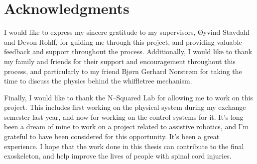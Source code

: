 \section*{Acknowledgments}

I would like to express my sincere gratitude to my supervisors, Øyvind Stavdahl and Devon Rohlf, for guiding me through this project, and providing valuable feedback and support throughout the process. 
Additionally, I would like to thank my family and friends for their support and encouragement throughout this process, and particularly to my friend Bjørn Gerhard Norstrøm for taking the time to discuss the physics behind the whiffletree mechanism.

Finally, I would like to thank the N--Squared Lab for allowing me to work on this project. This includes first working on the physical system during my exchange semester last year, and now for working on the control systems for it. It's long been a dream of mine to work on a project related to assistive robotics, and I'm grateful to have been considered for this opportunity. It's been a great experience. I hope that the work done in this thesis can contribute to the final exoskeleton, and help improve the lives of people with spinal cord injuries. 
